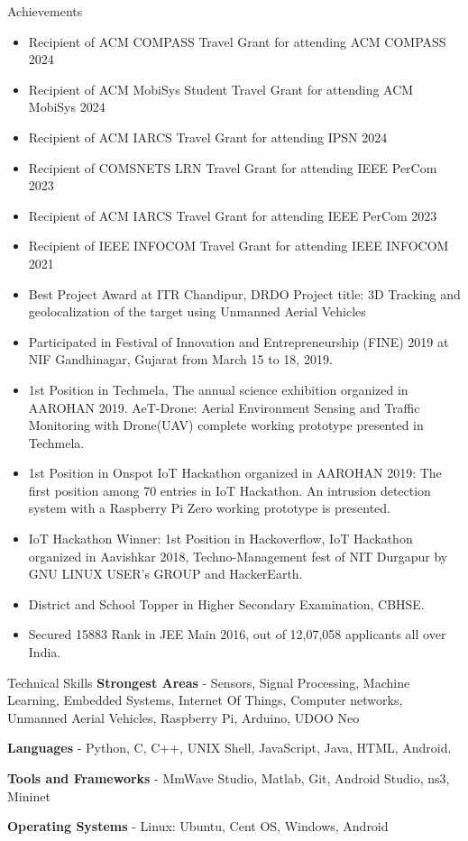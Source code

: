 \documentclass{resume} %
\begin{document}
	\begin{rSection}{Achievements} 
		\begin{itemize}
			\item Recipient of ACM COMPASS Travel Grant for attending ACM COMPASS 2024
			\item Recipient of ACM MobiSys Student Travel Grant for attending ACM MobiSys 2024
			\item Recipient of ACM IARCS Travel Grant for attending IPSN 2024
			\item Recipient of COMSNETS LRN Travel Grant for attending IEEE PerCom 2023
			\item Recipient of ACM IARCS Travel Grant for attending IEEE PerCom 2023
			\item Recipient of IEEE INFOCOM Travel Grant for attending IEEE INFOCOM 2021
			\item Best Project Award at ITR Chandipur, DRDO Project title: 3D Tracking and geolocalization of the target using Unmanned Aerial Vehicles
			\item Participated in Festival of Innovation and Entrepreneurship (FINE) 2019 at NIF Gandhinagar, Gujarat from March 15 to 18, 2019.
			\item 1st Position in Techmela, The annual science exhibition organized in AAROHAN 2019. AeT-Drone: Aerial Environment Sensing and Traffic Monitoring with Drone(UAV) complete working prototype presented in Techmela.
			\item 1st Position in Onspot IoT Hackathon organized in AAROHAN 2019: The first position among 70 entries in IoT Hackathon. An intrusion detection system with a Raspberry Pi Zero working prototype is presented.
			\item IoT Hackathon Winner: 1st Position in Hackoverflow, IoT Hackathon organized in Aavishkar 2018, Techno-Management fest of NIT Durgapur by GNU LINUX USER's GROUP and HackerEarth.
			\item District and School Topper in Higher Secondary Examination, CBHSE.
			\item Secured 15883 Rank in JEE Main 2016, out of 12,07,058
			applicants all over India.
		\end{itemize}
	\end{rSection}
	\newpage
	\begin{rSection}{Technical Skills}
		\textbf{Strongest Areas} - Sensors, Signal Processing, Machine Learning, Embedded Systems, Internet Of Things, Computer networks, Unmanned Aerial Vehicles, Raspberry Pi, Arduino, UDOO Neo
		
		\textbf{Languages} - Python, C, C++, UNIX Shell, JavaScript, Java, HTML, Android.
		
		\textbf{Tools and Frameworks} - MmWave Studio, Matlab, Git, Android Studio, ns3, Mininet
		
		\textbf{Operating Systems} - Linux: Ubuntu, Cent OS, Windows, Android\\
	\end{rSection}
	
\end{document}

